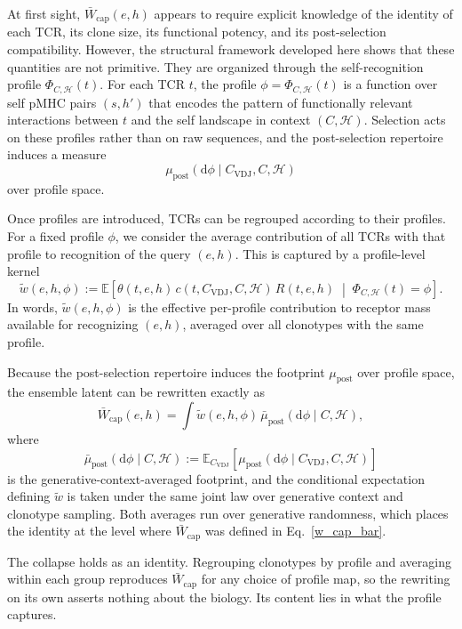 \documentclass[11pt]{article}
\begin{document}
At first sight, \(\bar{W}_{\mathrm{cap}}(e,h)\) appears to require explicit
knowledge of the identity of each TCR, its clone size, its functional potency,
and its post-selection compatibility. However, the structural framework
developed here shows that these quantities are not primitive. They are
organized through the self-recognition profile \(\Phi_{C,\mathcal{H}}(t)\). For each
TCR \(t\), the profile \(\phi=\Phi_{C,\mathcal{H}}(t)\) is a function over self pMHC
pairs \((s,h')\) that encodes the pattern of functionally relevant interactions
between \(t\) and the self landscape in context \((C,\mathcal{H})\). Selection acts on
these profiles rather than on raw sequences, and the post-selection repertoire
induces a measure
\[
\mu_{\mathrm{post}}(\mathrm{d}\phi \mid C_{\mathrm{VDJ}},C,\mathcal{H})
\]
over profile space.

Once profiles are introduced, TCRs can be regrouped according to their
profiles. For a fixed profile \(\phi\), we consider the average contribution of
all TCRs with that profile to recognition of the query \((e,h)\). This is
captured by a profile-level kernel
\[
\widetilde{w}(e,h,\phi)
:=
\mathbb{E}\left[
\theta(t,e,h)\,
c(t, C_{\mathrm{VDJ}},C,\mathcal{H})\,
R(t,e,h)
\;\middle|\;
\Phi_{C,\mathcal{H}}(t)=\phi
\right].
\]
In words, \(\widetilde{w}(e,h,\phi)\) is the effective per-profile contribution
to receptor mass available for recognizing \((e,h)\), averaged over all
clonotypes with the same profile.

Because the post-selection repertoire induces the footprint
\(\mu_{\mathrm{post}}\) over profile space, the ensemble latent can be rewritten
exactly as
\[
\bar{W}_{\mathrm{cap}}(e,h)
=
\int
\widetilde{w}(e,h,\phi)\,
\bar{\mu}_{\mathrm{post}}(\mathrm{d}\phi \mid C,\mathcal{H}),
\]
where
\[
\bar{\mu}_{\mathrm{post}}(\mathrm{d}\phi \mid C,\mathcal{H})
:=
\mathbb{E}_{C_{\mathrm{VDJ}}}\!\left[
\mu_{\mathrm{post}}(\mathrm{d}\phi \mid C_{\mathrm{VDJ}},C,\mathcal{H})
\right]
\]
is the generative-context-averaged footprint, and the conditional expectation
defining \(\widetilde{w}\) is taken under the same joint law over generative
context and clonotype sampling. Both averages run over generative randomness,
which places the identity at the level where \(\bar{W}_{\mathrm{cap}}\) was
defined in Eq.~\ref{w_cap_bar}.


The collapse holds as an identity. Regrouping clonotypes by profile and
averaging within each group reproduces \(\bar{W}_{\mathrm{cap}}\) for any choice
of profile map, so the rewriting on its own asserts nothing about the biology.
Its content lies in what the profile captures.
\end{document}
